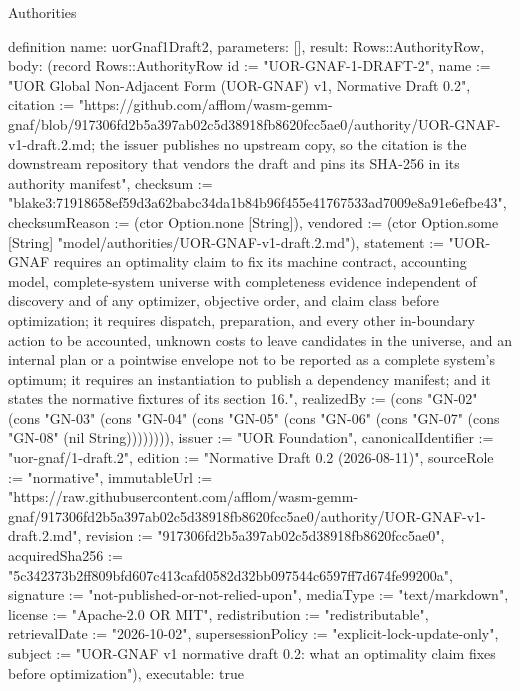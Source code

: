 \begin{lexlean}{Authorities}
\begin{semanticmodule}
definition{
  name: uorGnaf1Draft2,
  parameters: [],
  result: Rows::AuthorityRow,
  body: (record Rows::AuthorityRow {id := "UOR-GNAF-1-DRAFT-2", name := "UOR Global Non-Adjacent Form (UOR-GNAF) v1, Normative Draft 0.2", citation := "https://github.com/afflom/wasm-gemm-gnaf/blob/917306fd2b5a397ab02c5d38918fb8620fcc5ae0/authority/UOR-GNAF-v1-draft.2.md; the issuer publishes no upstream copy, so the citation is the downstream repository that vendors the draft and pins its SHA-256 in its authority manifest", checksum := "blake3:71918658ef59d3a62babc34da1b84b96f455e41767533ad7009e8a91e6efbe43", checksumReason := (ctor Option.none [String]), vendored := (ctor Option.some [String] "model/authorities/UOR-GNAF-v1-draft.2.md"), statement := "UOR-GNAF requires an optimality claim to fix its machine contract, accounting model, complete-system universe with completeness evidence independent of discovery and of any optimizer, objective order, and claim class before optimization; it requires dispatch, preparation, and every other in-boundary action to be accounted, unknown costs to leave candidates in the universe, and an internal plan or a pointwise envelope not to be reported as a complete system's optimum; it requires an instantiation to publish a dependency manifest; and it states the normative fixtures of its section 16.", realizedBy := (cons "GN-02" (cons "GN-03" (cons "GN-04" (cons "GN-05" (cons "GN-06" (cons "GN-07" (cons "GN-08" (nil String)))))))), issuer := "UOR Foundation", canonicalIdentifier := "uor-gnaf/1-draft.2", edition := "Normative Draft 0.2 (2026-08-11)", sourceRole := "normative", immutableUrl := "https://raw.githubusercontent.com/afflom/wasm-gemm-gnaf/917306fd2b5a397ab02c5d38918fb8620fcc5ae0/authority/UOR-GNAF-v1-draft.2.md", revision := "917306fd2b5a397ab02c5d38918fb8620fcc5ae0", acquiredSha256 := "5c342373b2ff809bfd607c413cafd0582d32bb097544c6597ff7d674fe99200a", signature := "not-published-or-not-relied-upon", mediaType := "text/markdown", license := "Apache-2.0 OR MIT", redistribution := "redistributable", retrievalDate := "2026-10-02", supersessionPolicy := "explicit-lock-update-only", subject := "UOR-GNAF v1 normative draft 0.2: what an optimality claim fixes before optimization"}),
  executable: true
}


\end{semanticmodule}
\end{lexlean}

